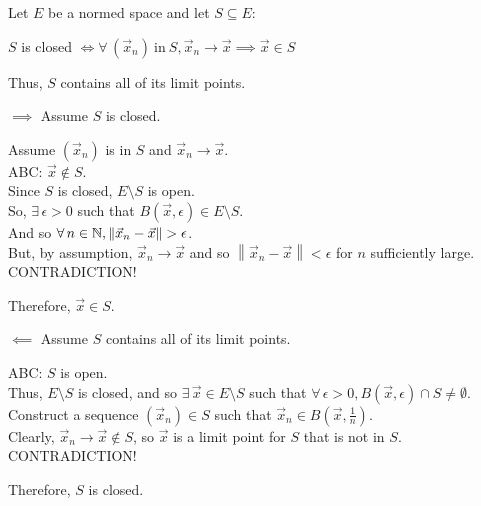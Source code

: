\documentclass[letterpaper,12pt,fleqn]{article}
\newcommand{\vx}{\vec{x}}
\newcommand{\norm}[1]{\left\|#1\right\|}
\newcommand{\e}{\epsilon}
\begin{document}
\begin{theorem}
  Let $E$ be a normed space and let $S\subseteq E$:

  \qquad$S$ is closed $\iff \forall\,(\vx_n)\ \mbox{in}\ S,
  \vx_n\to \vx\implies\vx\in S$

  Thus, $S$ contains all of its limit points.
\end{theorem}

\begin{theproof}
  \listbreak
  \begin{description}
  \item $\implies$ Assume $S$ is closed.

    Assume $(\vx_n)$ is in $S$ and $\vx_n\to\vx$. \\
    ABC: $\vx\notin S$. \\
    Since $S$ is closed, $E\setminus S$ is open. \\
    So, $\exists\,\e>0$ such that $B(\vx,\e)\in E\setminus S$. \\
    And so $\forall\,n\in\N,\norm{\vx_n-\vx}>\e$. \\
    But, by assumption, $\vx_n\to\vx$ and so $\norm{\vx_n-\vx}<\e$ for $n$
    sufficiently large. \\
    CONTRADICTION!

    Therefore, $\vx\in S$.

  \item $\impliedby$ Assume $S$ contains all of its limit points.

    ABC: $S$ is open. \\
    Thus, $E\setminus S$ is closed, and so $\exists\,\vx\in E\setminus S$ such
    that $\forall\,\e>0, B(\vx,\e)\cap S\ne\emptyset$. \\
    Construct a sequence $(\vx_n)\in S$ such that
    $\vx_n\in B(\vx,\frac{1}{n})$. \\
    Clearly, $\vx_n\to\vx\notin S$, so $\vx$ is a limit point for $S$ that is
    not in $S$. \\
    CONTRADICTION!

    Therefore, $S$ is closed.
  \end{description}
\end{theproof}
\end{document}
